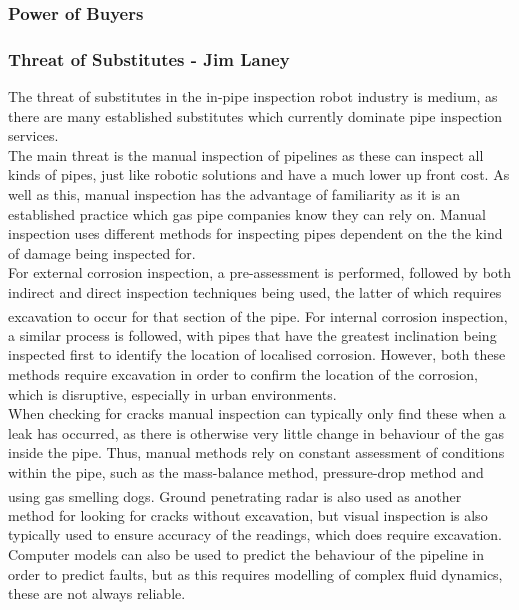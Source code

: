 \documentclass[11pt]{article}		%
\newcommand{\supercite}[1]{\textsuperscript{\cite{#1}}}		%
\begin{document}
			\subsubsection{Power of Buyers}
			
			\subsubsection{Threat of Substitutes - Jim Laney}
				
				The threat of substitutes in the in-pipe inspection robot industry is medium, as there are many established substitutes which currently dominate pipe inspection services.
				\\
				The main threat is the manual inspection of pipelines as these can inspect all kinds of pipes, just like robotic solutions and have a much lower up front cost.
				As well as this, manual inspection has the advantage of familiarity as it is an established practice which gas pipe companies know they can rely on.
				Manual inspection uses different methods for inspecting pipes dependent on the the kind of damage being inspected for.
				\\
				For external corrosion inspection, a pre-assessment is performed, followed by both indirect and direct inspection techniques being used, the latter of which requires excavation to occur for that section of the pipe\supercite{kishawy2010review}. 
				For internal corrosion inspection, a similar process is followed, with pipes that have the greatest inclination being inspected first to identify the location of localised corrosion. 
				However, both these methods require excavation in order to confirm the location of the corrosion, which is disruptive, especially in urban environments.
				\\
				When checking for cracks manual inspection can typically only find these when a leak has occurred, as there is otherwise very little change in behaviour of the gas inside the pipe.
				Thus, manual methods rely on constant assessment of conditions within the pipe, such as the mass-balance method, pressure-drop method and using gas smelling dogs\supercite{kishawy2010review}.
				Ground penetrating radar is also used as another method for looking for cracks without excavation, but visual inspection is also typically used to ensure accuracy of the readings, which does require excavation.
				Computer models can also be used to predict the behaviour of the pipeline in order to predict faults, but as this requires modelling of complex fluid dynamics, these are not always reliable.
\end{document}
